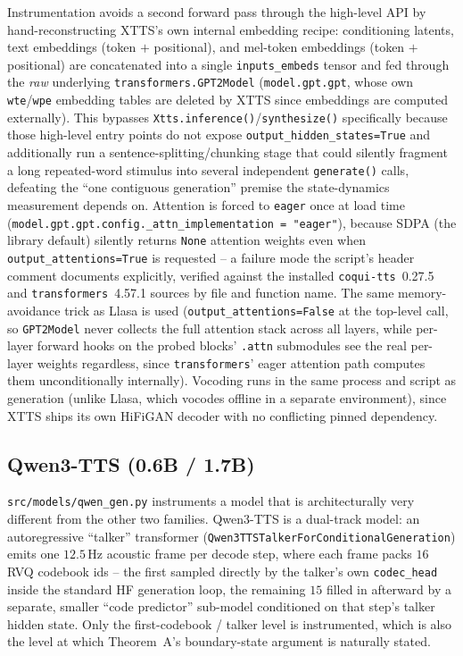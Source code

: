 \documentclass[11pt]{article}
\begin{document}
Instrumentation avoids a second forward pass through the high-level API by
hand-reconstructing XTTS's own internal embedding recipe: conditioning
latents, text embeddings (token $+$ positional), and mel-token embeddings
(token $+$ positional) are concatenated into a single \texttt{inputs\_embeds}
tensor and fed through the \emph{raw} underlying \texttt{transformers.GPT2Model}
(\texttt{model.gpt.gpt}, whose own \texttt{wte}/\texttt{wpe} embedding tables
are deleted by XTTS since embeddings are computed externally). This bypasses
\texttt{Xtts.inference()}/\texttt{synthesize()} specifically because those
high-level entry points do not expose \texttt{output\_hidden\_states=True}
and additionally run a sentence-splitting/chunking stage that could silently
fragment a long repeated-word stimulus into several independent
\texttt{generate()} calls, defeating the ``one contiguous generation''
premise the state-dynamics measurement depends on. Attention is forced to
\texttt{eager} once at load time
(\texttt{model.gpt.gpt.config.\_attn\_implementation = "eager"}), because
SDPA (the library default) silently returns \texttt{None} attention weights
even when \texttt{output\_attentions=True} is requested -- a failure mode the
script's header comment documents explicitly, verified against the installed
\texttt{coqui-tts}~0.27.5 and \texttt{transformers}~4.57.1 sources by file
and function name. The same memory-avoidance trick as Llasa is used
(\texttt{output\_attentions=False} at the top-level call, so
\texttt{GPT2Model} never collects the full attention stack across all
layers, while per-layer forward hooks on the probed blocks' \texttt{.attn}
submodules see the real per-layer weights regardless, since
\texttt{transformers}' eager attention path computes them unconditionally
internally). Vocoding runs in the same process and script as generation
(unlike Llasa, which vocodes offline in a separate environment), since
XTTS ships its own HiFiGAN decoder with no conflicting pinned dependency.

\subsection{Qwen3-TTS (0.6B / 1.7B)}

\texttt{src/models/qwen\_gen.py} instruments a model that is architecturally
very different from the other two families. Qwen3-TTS is a dual-track model:
an autoregressive ``talker'' transformer
(\texttt{Qwen3TTSTalkerForConditionalGeneration}) emits one $12.5$\,Hz
acoustic frame per decode step, where each frame packs $16$ RVQ codebook ids
-- the first sampled directly by the talker's own \texttt{codec\_head} inside
the standard HF generation loop, the remaining $15$ filled in afterward by a
separate, smaller ``code predictor'' sub-model conditioned on that step's
talker hidden state. Only the first-codebook / talker level is instrumented,
which is also the level at which Theorem~A's boundary-state argument is
naturally stated.
\end{document}

